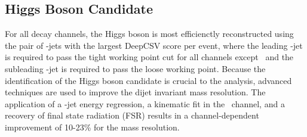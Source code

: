 \subsection{Higgs Boson Candidate}

For all decay channels, the Higgs boson is most efficienctly reconstructed using the pair of \qrkb-jets with the largest DeepCSV score per event, where the leading \qrkb-jet is required to pass the tight working point cut for all channels except \ZllH\ and the subleading \qrkb-jet is required to pass the loose working point. Because the identification of the Higgs boson candidate is crucial to the analysis, advanced techniques are used to improve the dijet invariant mass resolution. The application of a \qrkb-jet energy regression, a kinematic fit in the \ZllH\ channel, and a recovery of final state radiation (FSR) results in a channel-dependent improvement of 10-23\% for the mass resolution.

